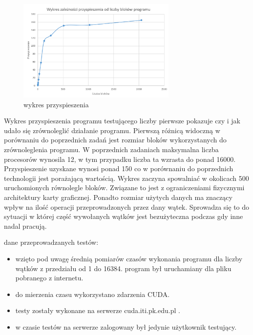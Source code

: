 \documentclass[a4paper,12pt]{article}
\newenvironment{lista}{
\begin{itemize}
  \setlength{\itemsep}{1pt}
  \setlength{\parskip}{0pt}
  \setlength{\parsep}{0pt}
}{\end{itemize}}
\begin{document}
\begin{figure}[!hbp]
	\centering
  \includegraphics[width=0.7\textwidth]{wykres.png}
  \caption{wykres przyspieszenia}
\end{figure}
Wykres przyspieszenia programu testującego liczby pierwsze pokazuje czy i jak udało się zrównoleglić działanie programu. Pierwszą różnicą widoczną w porównaniu do poprzednich zadań jest rozmiar bloków wykorzystanych do zrównoleglenia programu. W poprzednich zadaniach maksymalna liczba procesorów wynosila 12, w tym przypadku liczba ta wzrasta do ponad 16000. Przyspieszenie uzyskane wynosi ponad 150 co w porównaniu do poprzednich technologii jest porażającą wartością. Wykres zaczyna spowalniać w okolicach 500 uruchomionych równolegle bloków. Związane to jest z ograniczeniami fizycznymi architektury karty graficznej. Ponadto rozmiar użytych danych ma znaczący wpływ na ilość operacji przeprowadzonych przez dany wątek. Sprowadza się to do sytuacji w której część wywołanych wątków jest bezużyteczna podczas gdy inne nadal pracują. 
 
dane przeprowadzanych testów:
\begin{lista}
 \item wzięto pod uwagę średnią pomiarów czasów wykonania programu dla liczby wątków z przedziału od 1 do 16384. 
 program był uruchamiany dla pliku pobranego z internetu.
 \item do mierzenia czasu wykorzystano zdarzenia CUDA.
 \item testy zostały wykonane na serwerze cuda.iti.pk.edu.pl . 
 \item w czasie testów na serwerze zalogowany był jedynie użytkownik testujący.
\end{lista}
\end{document}
